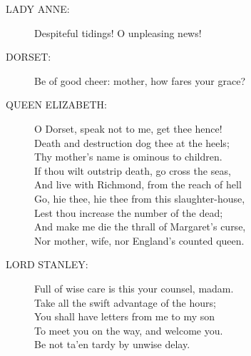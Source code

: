 \documentclass{article}
\begin{document}
\begin{description}
\item[LADY ANNE:] 
\hspace{1pt}Despiteful tidings! O unpleasing news!\\
\end{description}
\begin{description}
\item[DORSET:] 
\hspace{1pt}Be of good cheer: mother, how fares your grace?\\
\end{description}
\begin{description}
\item[QUEEN ELIZABETH:] 
\hspace{1pt}O Dorset, speak not to me, get thee hence!\\
\hspace{1pt}Death and destruction dog thee at the heels;\\
\hspace{1pt}Thy mother's name is ominous to children.\\
\hspace{1pt}If thou wilt outstrip death, go cross the seas,\\
\hspace{1pt}And live with Richmond, from the reach of hell\\
\hspace{1pt}Go, hie thee, hie thee from this slaughter-house,\\
\hspace{1pt}Lest thou increase the number of the dead;\\
\hspace{1pt}And make me die the thrall of Margaret's curse,\\
\hspace{1pt}Nor mother, wife, nor England's counted queen.\\
\end{description}
\begin{description}
\item[LORD STANLEY:] 
\hspace{1pt}Full of wise care is this your counsel, madam.\\
\hspace{1pt}Take all the swift advantage of the hours;\\
\hspace{1pt}You shall have letters from me to my son\\
\hspace{1pt}To meet you on the way, and welcome you.\\
\hspace{1pt}Be not ta'en tardy by unwise delay.\\
\end{description}
\end{document}
